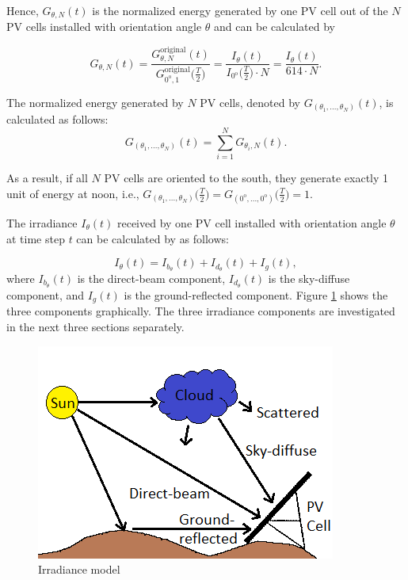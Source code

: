 Hence, $G_{\theta,N}(t)$ is the normalized energy generated by one PV cell out of the $N$ PV cells installed with orientation angle $\theta$ and can be calculated by

\begin{equation}\label{norma}
G_{\theta,N}(t)=\frac{G_{\theta,N}^{\text{original}}(t)}{G^{\text{original}}_{0^{\mathrm{o}},1}\big(\frac{T}{2}\big)}=\frac{I_{\theta}(t)}{I_{0^{\mathrm{o}}}\big(\frac{T}{2}\big)\cdot N}= \frac{I_{\theta}(t)}{614\cdot N}.
\end{equation}



The normalized energy generated by $N$ PV cells, denoted by $G_{(\theta_1, ..., \theta_N)}(t)$, is calculated as follows:
\begin{equation}\label{nor}
G_{(\theta_1, ..., \theta_N)}(t)=\sum_{i=1}^N G_{\theta_i,N}(t).
\end{equation}

As a result, if all $N$ PV cells are oriented to the south, they generate exactly 1 unit of energy at noon, i.e., $G_{(\theta_1, ..., \theta_N)}\big(\frac{T}{2}\big)=G_{(0^{\mathrm{o}}, ...,0^{\mathrm{o}})}\big(\frac{T}{2}\big)=1$.



The irradiance $I_{\theta}(t)$ received by one PV cell installed with orientation angle $\theta$ at time step $t$ can be calculated by \cite{Solar_Cell_3irradiance} as follows:


\begin{equation}\label{I1}
I_{\theta}(t)=I_{b_\theta}(t)+I_{d_\theta}(t)+I_{g}(t),
\end{equation}
where $I_{b_\theta}(t)$ is the direct-beam component, $I_{d_\theta}(t)$ is the sky-diffuse component, and $I_{g}(t)$ is the ground-reflected component. Figure \ref{3irradiances} shows the three components graphically. The three irradiance components are investigated in the next three sections separately.

\begin{figure}[H]
	\centering
		\includegraphics[width=0.6\columnwidth]{pictures/3irradiances}
\caption{Irradiance model\label{3irradiances}}
\end{figure}




